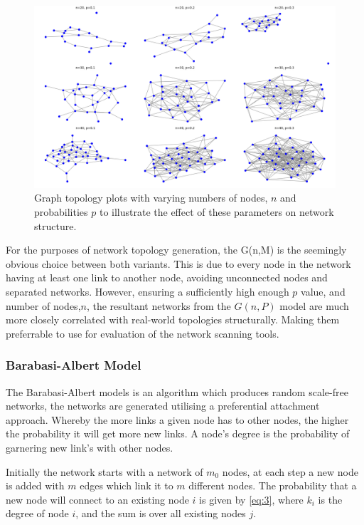 \begin{figure}
    \centering
    \includegraphics[width=0.75\linewidth]{images/ER/20,30,40.png}
    \caption{Graph topology plots with varying numbers of nodes, $n$ and probabilities $p$ to illustrate the effect of these parameters on network structure.}
    \label{fig:20,30,40}
\end{figure}

For the purposes of network topology generation, the G(n,M) is the seemingly obvious choice between both variants. This is due to every node in the network having at least one link to another node, avoiding unconnected nodes and separated networks. However, ensuring a sufficiently high enough $p$ value, and number of nodes,$n$,  the resultant networks from the $G(n,P)$ model are much more closely correlated with real-world topologies structurally. Making them preferrable to use for evaluation of the network scanning tools.

\subsubsection{Barabasi-Albert Model}

The Barabasi-Albert models is an algorithm which  produces random scale-free networks, the networks are generated utilising a preferential attachment approach. Whereby the more links a given node has to other nodes, the higher the probability it will get more new links. A node's degree is the probability of garnering new link's with other nodes.

Initially the network starts with a network of $m_0$ nodes, at each step a new node is added with $m$ edges which link it to $m$ different nodes. The probability that a new node will connect to an existing node $i$ is given by \ref{eq:3}, where $k_i$ is the degree of node $i$, and the sum is over all existing nodes $j$. \cite{Albert_barabasi_2002} 

